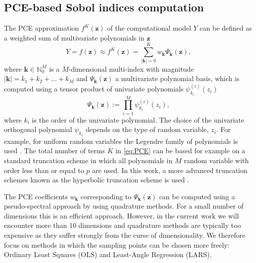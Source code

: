 \subsection{PCE-based Sobol indices computation}
The PCE approximation $f^{K}(\mathbf{z})$ of the computational model $Y$ can be defined as a weighted sum of multivariate polynomials in $\mathbf{z}$ \cite{RSmith}
\begin{equation}\label{eq:PCE}
Y= f(\mathbf{z}) \approx f^{K}(\mathbf{z}) = \sum_{|\mathbf{k}| = 0}^K w_{\mathbf{k}}\Psi_{\mathbf{k}}(\mathbf{z}),
\end{equation}
where $\mathbf{k}\in \mathbb{N}_0^M$ is a $M$-dimensional multi-index with magnitude $|\mathbf{k}| = k_1+k_2 + ... + k_M$ and $\Psi_{\mathbf{k}}(\mathbf{z})$ a multivariate polynomial basis, which is computed using a tensor product of univariate polynomials $\psi_{k_i}^{(i)}(z_i)$
\begin{equation}
\Psi_{\mathbf{k}}(\mathbf{z}) := \prod_{i=1}^M\psi_{k_i}^{(i)}(z_i),
\end{equation}
where $k_i$ is the order of the univariate polynomial. The choice of the univariate orthogonal polynomial $\psi_{k_i}$ depends on the type of random variable, $z_i$. For example, for uniform random variables the Legendre family of polynomials is used \cite{Xiu2002}. 
The total number of terms $K$ in \eqref{eq:PCE} can be based for example on a standard truncation scheme in which all polynomials in $M$ random variable with order less than or equal to $p$ are used. In this work, a more advanced truncation schemes known as the hyperbolic truncation scheme is used \cite{BlatmanThesis}. 

The PCE coefficients $w_{\mathbf{k}}$ corresponding to $\Psi_{\mathbf{k}}(\mathbf{z})$ can be computed using a pseudo-spectral approach by using quadrature methods. For a small number of dimensions this is an efficient approach. However, in the current work we will encounter more than 10 dimensions and quadrature methods are typically too expensive as they suffer strongly from the curse of dimensionality. We therefore focus on methods in which the sampling points can be chosen more freely: Ordinary Least Squares (OLS) and Least-Angle Regression (LARS).

